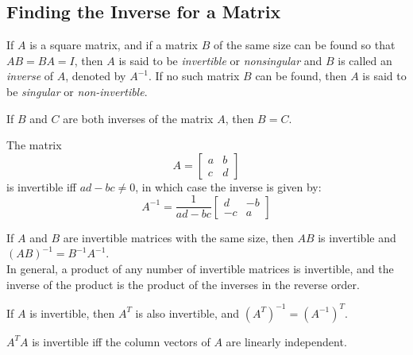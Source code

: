 \documentclass{report}
\begin{document}
		\subsection{Finding the Inverse for a Matrix}
		\begin{defn}[Inverse]\label{def_invertible_matrix}
			If $A$ is a square matrix, and if a matrix $B$ of the same size can be found so that $AB=BA=I$, then $A$ is said to be \emph{invertible} or \emph{nonsingular} and $B$ is called an \emph{inverse} of $A$, denoted by $A^{-1}$. If no such matrix $B$ can be found, then $A$ is said to be \emph{singular} or \emph{non-invertible}.
		\end{defn}
		
		\begin{thm}
			If $B$ and $C$ are both inverses of the matrix $A$, then $B=C$.
		\end{thm}
		
		\begin{thm}\label{thm_inv_2_by_2}
			The matrix
			\begin{displaymath}
				A=
				\begin{bmatrix}
					a & b \\ c & d
				\end{bmatrix}
			\end{displaymath}
			is invertible iff $ad-bc\ne0$, in which case the inverse is given by:
			\begin{displaymath}
				A^{-1}=\frac{1}{ad-bc}
				\begin{bmatrix}
					d & -b \\ -c & a
				\end{bmatrix}
			\end{displaymath}
		\end{thm}
		
		\begin{thm}
			If $A$ and $B$ are invertible matrices with the same size, then $AB$ is invertible and $(AB)^{-1}=B^{-1}A^{-1}$.\\
			In general, a product of any number of invertible matrices is invertible, and the inverse of the product is the product of the inverses in the reverse order.
		\end{thm}
		
		\begin{thm}
			If $A$ is invertible, then $A^T$ is also invertible, and $(A^T)^{-1}=(A^{-1})^T$.
		\end{thm}
	
		\begin{thm}\label{thm_ata}
			$A^TA$ is invertible iff the column vectors of $A$ are linearly independent.
		\end{thm}
		
\end{document}
